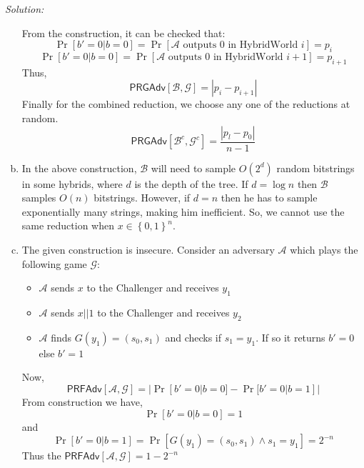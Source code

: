 \documentclass[a4paper, 11pt]{article}
\newenvironment{solution}
    {\textit{Solution:}}
    {\clearpage}
\newcommand{\bit}{\left\{0, 1\right\}}
\newcommand{\prf}{\mathsf{PRFAdv}}
\newcommand{\prg}{\mathsf{PRGAdv}}
\newcommand{\N}{\mathbb{N}}
\newcommand{\calA}{\mathcal{A}}
\newcommand{\calB}{\mathcal{B}}
\newcommand{\calG}{\mathcal{G}}
\begin{document}
\begin{solution}
\begin{enumerate}[(a)]
                  From the construction, it can be checked that:
                  $$\Pr[b'=0|b=0]=\Pr[\calA\text{ outputs 0 in HybridWorld } i]=p_{i}$$
                  $$\Pr[b'=0|b=0]=\Pr[\calA\text{ outputs 0 in HybridWorld } i+1]=p_{i+1}$$
                  Thus,
                  $$\prg[\calB,\calG]=|p_{i}-p_{i+1}|$$
                  Finally for the combined reduction, we choose any one of the reductions at random.
                  $$\prg[\calB^c,\calG^c]=\frac{|p_{l}-p_{0}|}{n-1}$$
        \item In the above construction, $\calB$ will need to sample $O(2^d)$ random bitstrings in some hybrids, where $d$ is the depth of the tree. If $d=\log n$ then $\calB$ samples $O(n)$ bitstrings. However, if $d=n$ then he has to sample exponentially many strings, making him inefficient. So, we cannot use the same reduction when $x\in\bit^n$.
        \item The given construction is insecure. Consider an adversary $\calA$ which plays the following game $\calG$:
        \begin{itemize}
            \item $\calA$ sends $x$ to the Challenger and receives $y_1$
            \item $\calA$ sends $x||1$ to the Challenger and receives $y_2$
            \item $\calA$ finds $G(y_1)=(s_0,s_1)$ and checks if $s_1=y_1$. If so it returns $b'=0$ else $b'=1$
        \end{itemize}
        Now,
        $$\prf[\calA,\calG]=|\Pr[b'=0|b=0]-\Pr[b'=0|b=1]|$$
        From construction we have,
        $$\Pr[b'=0|b=0]=1$$
        and
        $$\Pr[b'=0|b=1]=\Pr[G(y_1)=(s_0,s_1)\wedge s_1=y_1]=2^{-n}$$
        Thus the $\prf[\calA,\calG]=1-2^{-n}$
        

\end{enumerate}
\end{solution}
\end{document}
